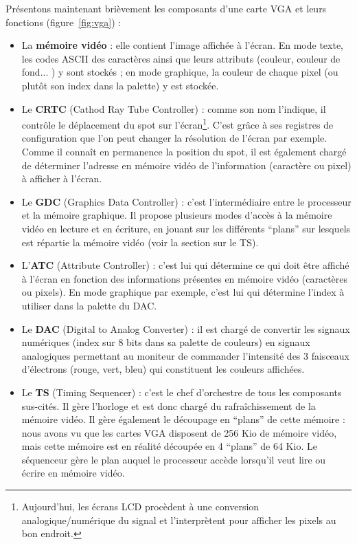 Présentons maintenant brièvement les composants d'une carte VGA et leurs fonctions (figure~\ref{fig:vga}) :
\begin{itemize} \vspace{1ex} \itemsep1ex
 \item La \textbf{mémoire vidéo} : elle contient l'image affichée à l'écran. En mode texte, les codes ASCII des caractères ainsi que leurs attributs (couleur, couleur de fond... ) y sont stockés ; en mode graphique, la couleur de chaque pixel (ou plutôt son index dans la palette) y est stockée.
 \item Le \textbf{CRTC} (Cathod Ray Tube Controller) : comme son nom l'indique, il contrôle le déplacement du spot sur l'écran\footnote{Aujourd'hui, les écrans LCD procèdent à une conversion analogique/numérique du signal et l'interprètent pour afficher les pixels au bon endroit.}. C'est grâce à ses registres de configuration que l'on peut changer la résolution de l'écran par exemple. Comme il connaît en permanence la position du spot, il est également chargé de déterminer l'adresse en mémoire vidéo de l'information (caractère ou pixel) à afficher à l'écran.
 \item Le \textbf{GDC} (Graphics Data Controller) : c'est l'intermédiaire entre le processeur et la mémoire graphique. Il propose plusieurs modes d'accès à la mémoire vidéo en lecture et en écriture, en jouant sur les différents ``plans'' sur lesquels est répartie la mémoire vidéo (voir la section sur le TS).
 \item L'\textbf{ATC} (Attribute Controller) : c'est lui qui détermine ce qui doit être affiché à l'écran en fonction des informations présentes en mémoire vidéo (caractères ou pixels). En mode graphique par exemple, c'est lui qui détermine l'index à utiliser dans la palette du DAC.
 \item Le \textbf{DAC} (Digital to Analog Converter) : il est chargé de convertir les signaux numériques (index sur 8 bits dans sa palette de couleurs) en signaux analogiques permettant au moniteur de commander l'intensité des 3 faisceaux d'électrons (rouge, vert, bleu) qui constituent les couleurs affichées.
 \item Le \textbf{TS} (Timing Sequencer) : c'est le chef d'orchestre de tous les composants sus-cités. Il gère l'horloge et est donc chargé du rafraîchissement de la mémoire vidéo. Il gère également le découpage en ``plans'' de cette mémoire : nous avons vu que les cartes VGA disposent de 256 Kio de mémoire vidéo, mais cette mémoire est en réalité découpée en 4 ``plans'' de 64 Kio. Le séquenceur gère le plan auquel le processeur accède lorsqu'il veut lire ou écrire en mémoire vidéo.
\end{itemize}


